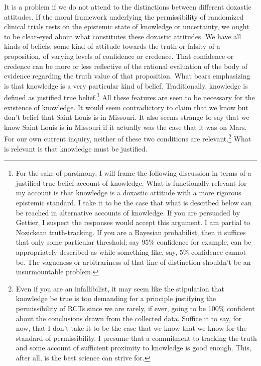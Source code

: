 \documentclass[letterpaper,notitlepage,12pt]{article}
\begin{document}
It is a problem if we do not attend to the distinctions between different
doxastic attitudes.
If the moral framework underlying the permissibility of randomized clinical
trials rests on the epistemic state of knowledge or uncertainty, we ought to be
clear-eyed about what constitutes these doxastic attitudes.
We have all kinds of beliefs, some kind of attitude towards the truth or falsity
of a proposition, of varying levels of confidence or credence.
That confidence or credence can be more or less reflective of the rational
evaluation of the body of evidence regarding the truth value of that
proposition.
What bears emphasizing is that knowledge is a very particular kind of belief.
Traditionally, knowledge is defined as justified true belief.\footnote{For the
  sake of parsimony, I will frame the following discussion in terms of a
  justified true belief account of knowledge. What is functionally relevant for
  my account is that knowledge is a doxastic attitude with a more rigorous
  epistemic standard. I take it to be the case that what is described below can
  be reached in alternative accounts of knowledge. If you are persuaded by
  Gettier, I suspect the responses would accept this argument. I am partial to
  Nozickean truth-tracking. If you are a Bayesian probabilist, then it suffices
  that only some particular threshold, say 95\% confidence for example, can be
  appropriately described as  while something like, say,
  5\% confidence cannot be. The vagueness or arbitrariness of that line of
distinction shouldn't be an insurmountable problem.}
All these features are seen to be necessary for the existence of knowledge.
It would seem contradictory to claim that we know but don't belief that Saint
Louis is in Missouri.
It also seems strange to say that we know Saint Louis is in Missouri if it
actually was the case that it was on Mars.
For our own current inquiry, neither of these two conditions are
relevant.\footnote{Even if you are an infallibilist, it may seem like the
  stipulation that knowledge be true is too demanding for a principle justifying
  the permissibility of RCTs since we are rarely, if ever, going to be 100\%
  confident about the conclusions drawn from the collected data. Suffice it to
  say, for now, that I don't take it to be the case that we know that we know
  for the standard of permissibility. I presume that a commitment to tracking
  the truth and some account of sufficient proximity to knowledge is good enough.
  This, after all, is the best science can strive for.}
What is relevant is that knowledge must be justified.
\end{document}
